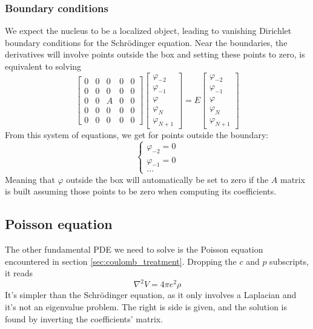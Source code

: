 \subsubsection{Boundary conditions}
We expect the nucleus to be a localized object, leading to vanishing Dirichlet boundary conditions for the Schr\"odinger equation.
Near the boundaries, the derivatives will involve points outside the box and setting these points to zero, is equivalent to solving 
\begin{equation}
    \begin{bmatrix}
        0 & 0 & 0 & 0 & 0
        \\0 & 0 & 0 & 0 & 0
        \\0 & 0 & A & 0 & 0
        \\0 & 0 & 0 & 0 & 0
        \\0 & 0 & 0 & 0 & 0
    \end{bmatrix}
    \begin{bmatrix}
        \varphi_{-2}\\\varphi_{-1}\\\varphi\\\varphi_{N}\\ \varphi_{N+1} 
    \end{bmatrix}
    = E 
    \begin{bmatrix}
        \varphi_{-2}\\\varphi_{-1}\\\varphi\\\varphi_{N}\\ \varphi_{N+1} 
    \end{bmatrix}
\end{equation}
From this system of equations, we get for points outside the boundary:
\begin{equation}
    \begin{cases}
        \varphi_{-2} = 0\\
        \varphi_{-1} = 0\\
        \ldots
    \end{cases}
\end{equation}
Meaning that $\varphi$ outside the box will automatically be set to zero if the $A$ matrix is built assuming those points to be zero when computing its coefficients.
\subsection{Poisson equation}
\label{subsec:poisson}
The other fundamental PDE we need to solve is the Poisson equation encountered in section \ref{sec:coulomb_treatment}. Dropping the $c$ and $p$ subscripts, it reads
\begin{equation*}
\nabla^2 V = 4\pi e^2 \rho
\end{equation*}
It's simpler than the Schr\"odinger equation, as it only involves a Laplacian and it's not an eigenvalue problem. The right is side is given, and the solution is found by inverting the coefficients' matrix.

